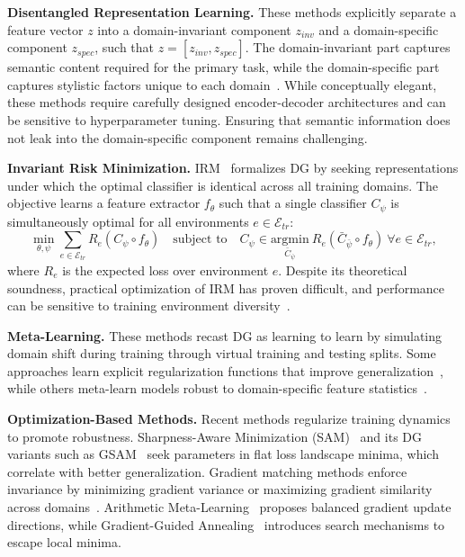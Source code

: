 \documentclass[preprint,12pt]{elsarticle}
\begin{document}
\textbf{Disentangled Representation Learning.} These methods explicitly separate a feature vector $z$ into a domain-invariant component $z_{inv}$ and a domain-specific component $z_{spec}$, such that $z = [z_{inv}, z_{spec}]$. The domain-invariant part captures semantic content required for the primary task, while the domain-specific part captures stylistic factors unique to each domain~\citep{bui2021exploiting, peng2019domain, ilse2020diva}. While conceptually elegant, these methods require carefully designed encoder-decoder architectures and can be sensitive to hyperparameter tuning. Ensuring that semantic information does not leak into the domain-specific component remains challenging.

\textbf{Invariant Risk Minimization.} IRM~\citep{arjovsky2019invariant} formalizes DG by seeking representations under which the optimal classifier is identical across all training domains. The objective learns a feature extractor $f_\theta$ such that a single classifier $C_\psi$ is simultaneously optimal for all environments $e \in \mathcal{E}_{tr}$:
\begin{equation}
    \min_{\theta, \psi} \sum_{e \in \mathcal{E}_{tr}} R_e(C_\psi \circ f_\theta) \quad \text{subject to} \quad C_\psi \in \underset{\bar{C}_{\bar{\psi}}}{\text{argmin}} \ R_e(\bar{C}_{\bar{\psi}} \circ f_\theta) \ \forall e \in \mathcal{E}_{tr},
\end{equation}
where $R_e$ is the expected loss over environment $e$. Despite its theoretical soundness, practical optimization of IRM has proven difficult, and performance can be sensitive to training environment diversity~\citep{gulrajani2020search}.

\textbf{Meta-Learning.} These methods recast DG as learning to learn by simulating domain shift during training through virtual training and testing splits. Some approaches learn explicit regularization functions that improve generalization~\citep{balaji2018metareg}, while others meta-learn models robust to domain-specific feature statistics~\citep{dou2019meta_invariant}.

\textbf{Optimization-Based Methods.} Recent methods regularize training dynamics to promote robustness. Sharpness-Aware Minimization (SAM)~\citep{foret2021sharpness} and its DG variants such as GSAM~\citep{zhuang2022surrogate} seek parameters in flat loss landscape minima, which correlate with better generalization. Gradient matching methods enforce invariance by minimizing gradient variance or maximizing gradient similarity across domains~\citep{shi2022gradient, rame2022fishr}. Arithmetic Meta-Learning~\citep{Wang2025BalancedDF} proposes balanced gradient update directions, while Gradient-Guided Annealing~\citep{gga2025} introduces search mechanisms to escape local minima.
\end{document}
